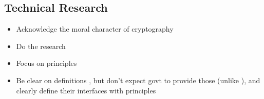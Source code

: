 \subsection{Technical Research}

\begin{itemize}
    \item Acknowledge the moral character of cryptography \cite{rogaway_moral_2015}
    \item Do the research
    \item Focus on principles \cite{levy_robinson_2018}
    \item Be clear on definitions \cite{varia_2018}, but don't expect govt to provide those (unlike
            \cite{abelson_2015}), and clearly define their interfaces with principles
            \cite{matyas_incommensurability_2018}
\end{itemize}
